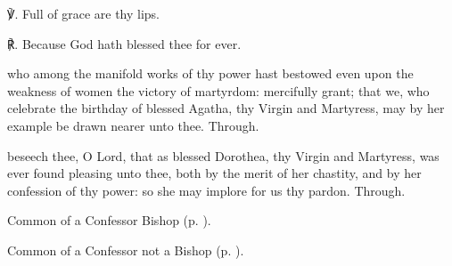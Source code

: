 ℣. Full of grace are thy lips.

℟. Because God hath blessed thee for ever.


\collect
{} who among the manifold works of thy power hast bestowed even upon the weakness of women the victory of martyrdom: mercifully grant; that we, who celebrate the birthday of blessed Agatha, thy Virgin and Martyress, may by her example be drawn nearer unto thee. Through.




\memorialCollect
{} beseech thee, O Lord, that as blessed Dorothea, thy Virgin and Martyress, was ever found pleasing unto thee, both by the merit of her chastity, and by her confession of thy power: so she may implore for us thy pardon. Through.



\begin{rubric}
	Common of a Confessor Bishop (p. \pageref{ConfessorBishopCollect}).
\end{rubric}



\begin{rubric}
	Common of a Confessor not a Bishop (p. \pageref{AbbotCollect}).
\end{rubric}




